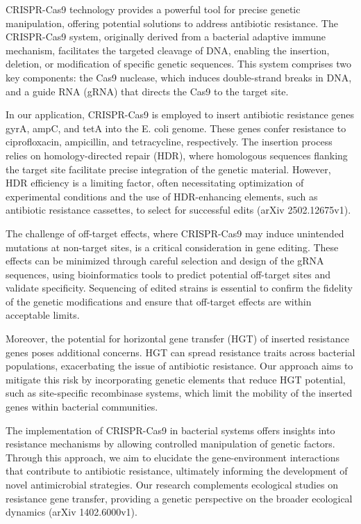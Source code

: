 \documentclass{article}
\begin{document}
CRISPR-Cas9 technology provides a powerful tool for precise genetic manipulation, offering potential solutions to address antibiotic resistance. The CRISPR-Cas9 system, originally derived from a bacterial adaptive immune mechanism, facilitates the targeted cleavage of DNA, enabling the insertion, deletion, or modification of specific genetic sequences. This system comprises two key components: the Cas9 nuclease, which induces double-strand breaks in DNA, and a guide RNA (gRNA) that directs the Cas9 to the target site.

In our application, CRISPR-Cas9 is employed to insert antibiotic resistance genes gyrA, ampC, and tetA into the E. coli genome. These genes confer resistance to ciprofloxacin, ampicillin, and tetracycline, respectively. The insertion process relies on homology-directed repair (HDR), where homologous sequences flanking the target site facilitate precise integration of the genetic material. However, HDR efficiency is a limiting factor, often necessitating optimization of experimental conditions and the use of HDR-enhancing elements, such as antibiotic resistance cassettes, to select for successful edits (arXiv 2502.12675v1).

The challenge of off-target effects, where CRISPR-Cas9 may induce unintended mutations at non-target sites, is a critical consideration in gene editing. These effects can be minimized through careful selection and design of the gRNA sequences, using bioinformatics tools to predict potential off-target sites and validate specificity. Sequencing of edited strains is essential to confirm the fidelity of the genetic modifications and ensure that off-target effects are within acceptable limits.

Moreover, the potential for horizontal gene transfer (HGT) of inserted resistance genes poses additional concerns. HGT can spread resistance traits across bacterial populations, exacerbating the issue of antibiotic resistance. Our approach aims to mitigate this risk by incorporating genetic elements that reduce HGT potential, such as site-specific recombinase systems, which limit the mobility of the inserted genes within bacterial communities.

The implementation of CRISPR-Cas9 in bacterial systems offers insights into resistance mechanisms by allowing controlled manipulation of genetic factors. Through this approach, we aim to elucidate the gene-environment interactions that contribute to antibiotic resistance, ultimately informing the development of novel antimicrobial strategies. Our research complements ecological studies on resistance gene transfer, providing a genetic perspective on the broader ecological dynamics (arXiv 1402.6000v1).
\end{document}
